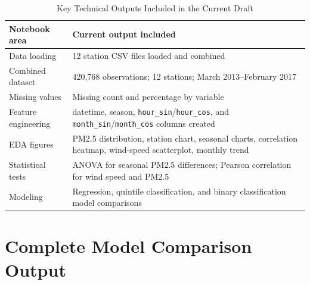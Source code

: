 \documentclass[stu,12pt,floatsintext]{apa7}
\begin{document}
\begin{table}[H]
  \begin{threeparttable}
  \caption{Key Technical Outputs Included in the Current Draft}
  \label{tab:outputs}
  \begin{tabular}{p{3cm}p{9.5cm}}
    \toprule
    \textbf{Notebook area}   & \textbf{Current output included} \\
    \midrule
    Data loading             & 12 station CSV files loaded and combined \\
    Combined dataset         & 420,768 observations; 12 stations; March 2013--February 2017 \\
    Missing values           & Missing count and percentage by variable \\
    Feature engineering      & datetime, season, \texttt{hour\_sin}/\texttt{hour\_cos},
                               and \texttt{month\_sin}/\texttt{month\_cos} columns created \\
    EDA figures              & PM2.5 distribution, station chart, seasonal charts,
                               correlation heatmap, wind-speed scatterplot, monthly trend \\
    Statistical tests        & ANOVA for seasonal PM2.5 differences; Pearson correlation
                               for wind speed and PM2.5 \\
    Modeling                 & Regression, quintile classification, and binary
                               classification model comparisons \\
    \bottomrule
  \end{tabular}
  \end{threeparttable}
\end{table}

\section{Complete Model Comparison Output}
\end{document}
